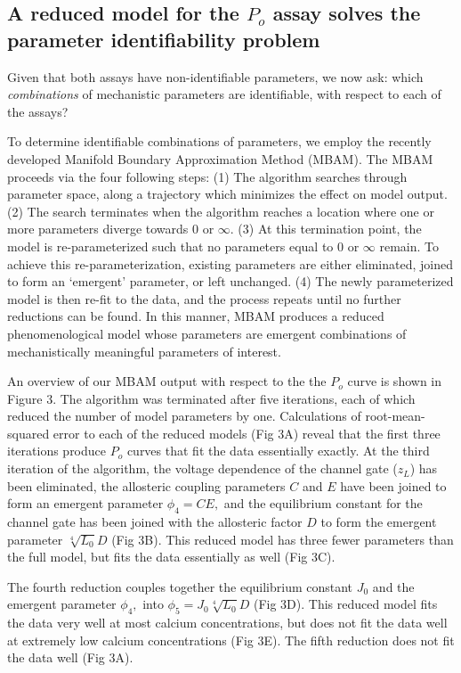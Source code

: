 \documentclass[10pt]{amsart}
\newcommand\po{P_o}
\newcommand{\zl}{z_L}
\begin{document}
\subsection{A reduced model for the $\po$ assay solves the parameter identifiability problem}


Given that both assays have non-identifiable parameters, we now ask: which {\it combinations} of mechanistic parameters are identifiable, with respect to each of the assays?

To determine identifiable combinations of parameters, we employ the recently developed Manifold Boundary Approximation Method (MBAM).  The MBAM proceeds via the four following steps: (1) The algorithm searches through parameter space, along a trajectory which minimizes the effect on model output.  (2) The search terminates when the algorithm reaches a location where one or more parameters diverge towards $0$ or $\infty.$  (3) At this termination point, the model is re-parameterized such that no parameters equal to $0$ or $\infty$ remain.  To achieve this re-parameterization, existing parameters are either eliminated, joined to form an `emergent' parameter, or left unchanged.  (4) The newly parameterized model is then re-fit to the data, and the process repeats until no further reductions can be found.  In this manner, MBAM produces a reduced phenomenological model whose parameters are emergent combinations of mechanistically meaningful parameters of interest.

An overview of our MBAM output with respect to the the $\po$ curve is shown in Figure 3.  The algorithm was terminated after five iterations, each of which reduced the number of model parameters by one.  Calculations of root-mean-squared error to each of the reduced models (Fig 3A) reveal that the first three iterations produce $\po$ curves that fit the data essentially exactly.  At the third iteration of the algorithm, the voltage dependence of the channel gate ($\zl$) has been eliminated, the allosteric coupling parameters $C$ and $E$ have been joined to form an emergent parameter $\phi_4=CE,$ and the equilibrium constant for the channel gate has been joined with the allosteric factor $D$ to form the emergent parameter $\sqrt[4]{L_0}D$ (Fig 3B).  This reduced model has three fewer parameters than the full model, but fits the data essentially as well (Fig 3C). 

The fourth reduction couples together the equilibrium constant $J_0$ and the emergent parameter $\phi_4,$ into $\phi_5=J_0\sqrt[4]{L_0}D$ (Fig 3D).  This reduced model fits the data very well at most calcium concentrations, but does not fit the data well at extremely low calcium concentrations (Fig 3E).  The fifth reduction does not fit the data well (Fig 3A).
\end{document}

